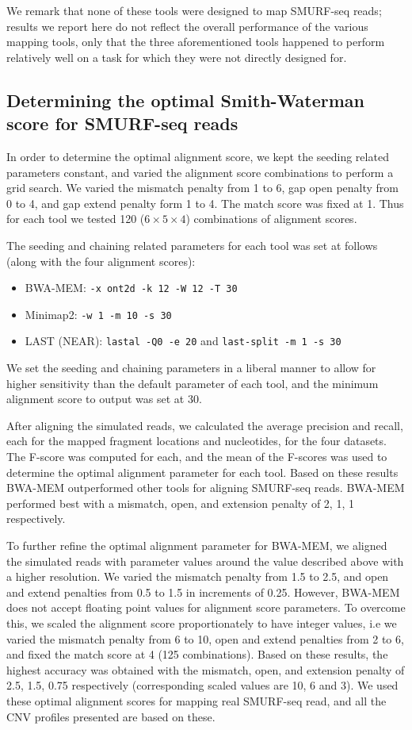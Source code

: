 We remark that none of these tools were designed to map SMURF-seq reads;
results we report here do not reflect the overall performance of the
various mapping tools, only that the three aforementioned tools happened
to perform relatively well on a task for which they were not directly
designed for.


\subsection{Determining the optimal Smith-Waterman score for
  SMURF-seq reads}
In order to determine the optimal alignment score, we kept the seeding
related parameters constant, and varied the alignment score combinations
to perform a grid search. We varied the mismatch penalty from 1 to 6,
gap open penalty from 0 to 4, and gap extend penalty form 1 to 4.  The
match score was fixed at 1. Thus for each tool we tested 120 ($6 \times
5 \times 4$) combinations of alignment scores.

The seeding and chaining related parameters for each tool was set at
follows (along with the four alignment scores):
\begin{itemize}
\item BWA-MEM: \texttt{-x ont2d -k 12 -W 12 -T 30}
\item Minimap2: \texttt{-w 1 -m 10 -s 30}
\item LAST (NEAR): \texttt{lastal -Q0 -e 20} and \texttt{last-split -m 1 -s 30}
\end{itemize}
We set the seeding and chaining parameters in a liberal manner to allow
for higher sensitivity than the default parameter of each tool, and
the minimum alignment score to output was set at 30.

After aligning the simulated reads, we calculated the average precision
and recall, each for the mapped fragment locations and nucleotides, for
the four datasets. The F-score was computed for each, and the mean of
the F-scores was used to determine the optimal alignment parameter for
each tool. Based on these results BWA-MEM outperformed other tools for
aligning SMURF-seq reads. BWA-MEM performed best with a mismatch, open,
and extension penalty of 2, 1, 1 respectively.

To further refine the optimal alignment parameter for BWA-MEM, we
aligned the simulated reads with parameter values around the value
described above with a higher resolution. We varied the mismatch penalty
from 1.5 to 2.5, and open and extend penalties from 0.5 to 1.5 in
increments of 0.25.
%
However, BWA-MEM does not accept floating point values for alignment
score parameters. To overcome this, we scaled the alignment score
proportionately to have integer values, i.e we varied the mismatch
penalty from 6 to 10, open and extend penalties from 2 to 6, and fixed
the match score at 4 (125 combinations).
%
Based on these results, the highest accuracy was obtained with the
mismatch, open, and extension penalty of 2.5, 1.5, 0.75 respectively
(corresponding scaled values are 10, 6 and 3). We used these optimal
alignment scores for mapping real SMURF-seq read, and all the CNV
profiles presented are based on these.


